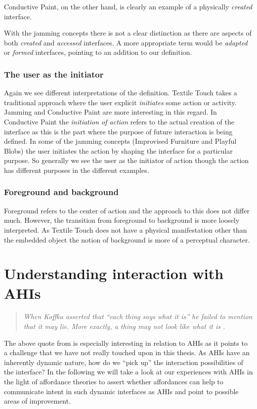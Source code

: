 Conductive Paint, on the other hand, is clearly an example of a physically \emph{created} interface.

With the jamming concepts there is not a clear distinction as there are aspects of both \emph{created} and \emph{accessed} interfaces.
A more appropriate term would be \emph{adapted} or \emph{formed} interfaces, pointing to an addition to our definition.

\subsubsection{The user as the initiator} 
Again we see different interpretations of the definition.
Textile Touch takes a traditional approach where the user explicit \emph{initiates} some action or activity.
Jamming and Conductive Paint are more interesting in this regard.
In Conductive Paint the \emph{initiation of action} refers to the actual creation of the interface as this is the part where the purpose of future interaction is being defined.
In some of the jamming concepts (Improvised Furniture and Playful Blobs) the user initiates the action by shaping the interface for a particular purpose.
So generally we see the user as the initiator of action though the action has different purposes in the different examples.

\subsubsection{Foreground and background}
Foreground refers to the center of action and the approach to this does not differ much.
However, the transition from foreground to background is more loosely interpreted.
As Textile Touch does not have a physical manifestation other than the embedded object the notion of background is more of a perceptual character.




\section{Understanding interaction with AHIs}
\begin{quotation}
\emph{When Koffka asserted that ``each thing says what it is'' he failed to mention that it may lie. More exactly, a thing may not look like what it is \citep{gibson1979ecological}.}
\end{quotation}
The above quote from \citeauthor{gibson1979ecological} is especially interesting in relation to AHIs as it points to a challenge that we have not really touched upon in this thesis.
As AHIs have an inherently dynamic nature, how do we ``pick up'' the interaction possibilities of the interface? 
In the following we will take a look at our experiences with AHIs in the light of affordance theories to assert whether affordances can help to communicate intent in such dynamic interfaces as AHIs and point to possible areas of improvement.

